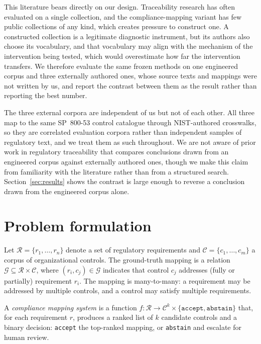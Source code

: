 \documentclass[smallextended,natbib]{svjour3}
\begin{document}
This literature bears directly on our design.
Traceability research has often evaluated on a single collection, and the compliance-mapping variant has few public collections of any kind, which creates pressure to construct one.
A constructed collection is a legitimate diagnostic instrument, but its authors also choose its vocabulary, and that vocabulary may align with the mechanism of the intervention being tested, which would overestimate how far the intervention transfers.
We therefore evaluate the same frozen methods on one engineered corpus and three externally authored ones, whose source texts and mappings were not written by us, and report the contrast between them as the result rather than reporting the best number.

The three external corpora are independent of us but not of each other.
All three map to the same SP~800-53 control catalogue through NIST-authored crosswalks, so they are correlated evaluation corpora rather than independent samples of regulatory text, and we treat them as such throughout.
We are not aware of prior work in regulatory traceability that compares conclusions drawn from an engineered corpus against externally authored ones, though we make this claim from familiarity with the literature rather than from a structured search.
Section~\ref{sec:results} shows the contrast is large enough to reverse a conclusion drawn from the engineered corpus alone.


\section{Problem formulation}
\label{sec:formulation}


Let $\mathcal{R} = \{r_1, \ldots, r_n\}$ denote a set of regulatory requirements and $\mathcal{C} = \{c_1, \ldots, c_m\}$ a corpus of organizational controls.
The ground-truth mapping is a relation $\mathcal{G} \subseteq \mathcal{R} \times \mathcal{C}$, where $(r_i, c_j) \in \mathcal{G}$ indicates that control $c_j$ addresses (fully or partially) requirement $r_i$.
The mapping is many-to-many: a requirement may be addressed by multiple controls, and a control may satisfy multiple requirements.

A \emph{compliance mapping system} is a function $f: \mathcal{R} \rightarrow \mathcal{C}^k \times \{\texttt{accept}, \texttt{abstain}\}$ that, for each requirement $r$, produces a ranked list of $k$ candidate controls and a binary decision: \texttt{accept} the top-ranked mapping, or \texttt{abstain} and escalate for human review.
\end{document}
